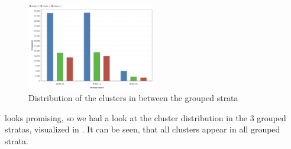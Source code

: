 \begin{figure}[!htbp]
\centering
\includegraphics[width=0.5\textwidth]{ClusterOrigRapidDistribution2Cluster.PNG}
\caption{Distribution of the clusters in between the grouped strata}
\label{fig:Groupdist}
\end{figure}

 looks promising, so we had a look at the cluster distribution in the 3 grouped stratas, visualized in . It can be seen, that all clusters appear in all grouped strata. 

